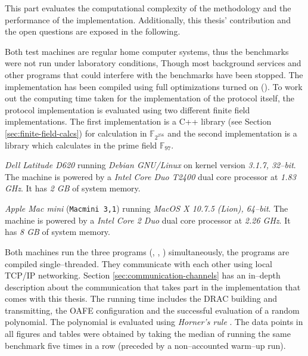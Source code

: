 \label{sec:evaluation}

This part evaluates the computational complexity of the methodology and the
performance of the implementation. Additionally, this thesis' contribution and
the open questions are exposed in the following.

%
%
\label{sec:test-setup}

\label{sec:test-machines}

Both test machines are regular home computer systems, thus the benchmarks were
not run under laboratory conditions, Though most background services and other
programs that could interfere with the benchmarks have been stopped. The
implementation has been compiled using full optimizations turned on
(). To work out the computing time
taken for the implementation of the protocol itself, the protocol implementation
is evaluated using two different finite field implementations.
The first implementation is a C++ library (see Section
\ref{sec:finite-field-calcs}) for calculation in $\mathbb{F}_{2^{256}}$ and the
second implementation is a \JWThaskell{} library which calculates in the prime
field $\mathbb{F}_{97}$.



\emph{Dell Latitude D620} running \emph{Debian GNU/Linux} on kernel version
\emph{3.1.7, 32--bit}. The machine is powered by a \emph{Intel\TReg{} Core Duo
T2400} dual core processor at \emph{1.83 GHz}. It has \emph{2 GB} of system
memory.



\emph{Apple Mac mini} (\texttt{Macmini 3,1}) running \emph{MacOS X 10.7.5
(Lion), 64--bit}. The machine is powered by a \emph{Intel\TReg{} Core 2 Duo}
dual core processor at \emph{2.26 GHz}. It has \emph{8 GB} of system memory.


Both machines run the three programs (\JWBpOne{}, \JWBpTwo{}, \JWBtoken{})
simultaneously, the programs are compiled single--threaded. They
communicate with each other using local TCP/IP networking. Section
\ref{sec:communication-channels} has an in--depth description about the
communication that takes part in the implementation that comes with this thesis.
The running time includes the DRAC building and transmitting, the OAFE
configuration and the successful evaluation of a random polynomial. The
polynomial is evaluated using \emph{Horner's rule} \cite{cormen01}. The data
points in all figures and tables were obtained by taking the median of
running the same benchmark five times in a row (preceded by a non--accounted
warm--up run).


